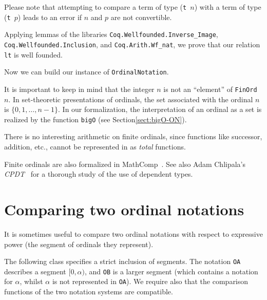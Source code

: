 Please note  that attempting to compare a term  of type (\texttt{t $n$}) with a term of
type (\texttt{t $p$})  leads to an error if $n$ and $p$ are not convertible.






Applying lemmas of the libraries \texttt{Coq.Wellfounded.Inverse\_Image}, \linebreak
 \texttt{Coq.Wellfounded.Inclusion}, and \texttt{Coq.Arith.Wf\_nat}, we prove that our
relation \texttt{lt} is well founded.




Now we can build our instance of \texttt{OrdinalNotation}.



\begin{remark}
It is important to keep in mind  that the integer $n$ is not an ``element'' of \texttt{FinOrd $n$}. In set-theoretic presentations of ordinals, the set associated with the ordinal $n$ is $\{0,1,\dots,n-1\}$. 
In our formalization, the interpretation of an ordinal as a set is realized by the function \texttt{bigO} (see Section\vref{sect:bigO-ON}).
\end{remark}


\begin{remark}
 There is no interesting arithmetic on finite ordinals, since functions like successor, addition, etc.,  cannot be represented in \coq{} as \emph{total} functions.
\end{remark}

\begin{remark}
Finite ordinals are also formalized in MathComp~\cite{MCB}.  See also Adam Chlipala's \emph{CPDT}~\cite{chlipalacpdt2011} for a thorough study of the use of dependent types.  
\end{remark}




\section{Comparing two ordinal notations}

It is sometimes useful to compare two ordinal notations with respect to expressive power
(the segment of ordinals  they represent). 

The following class specifies a strict inclusion of segments. The notation \texttt{OA} describes a segment $[0,\alpha)$, and \texttt{OB} is a larger segment (which contains a notation for $\alpha$, whilst $\alpha$ is not represented in \texttt{OA}). We require also  that the comparison functions of the two notation systems are compatible.

